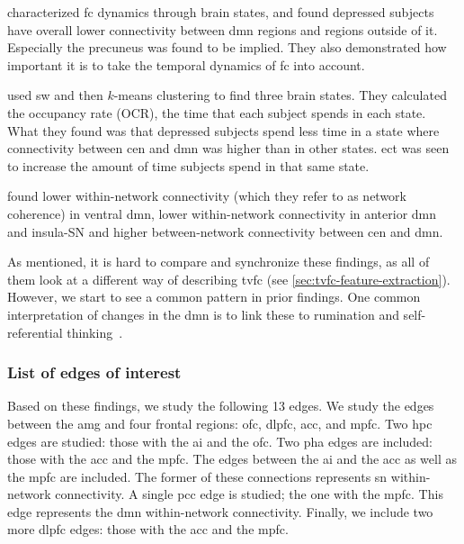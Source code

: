 \textcite{AlonsoMartinez2020} characterized \gls{fc} dynamics through brain states, and found depressed subjects have overall lower connectivity between \gls{dmn} regions and regions outside of it.
Especially the precuneus was found to be implied.
They also demonstrated how important it is to take the temporal dynamics of \gls{fc} into account.

\textcite{Dini2021} used \gls{sw} and then $k$-means clustering to find three brain states.
They calculated the occupancy rate (OCR), the time that each subject spends in each state.
What they found was that depressed subjects spend less time in a state where connectivity between \gls{cen} and \gls{dmn} was higher than in other states.
\Gls{ect} was seen to increase the amount of time subjects spend in that same state.

\textcite{Ho2021} found lower within-network connectivity (which they refer to as network coherence) in ventral \gls{dmn}, lower within-network connectivity in anterior \gls{dmn} and insula-SN and higher between-network connectivity between \gls{cen} and \gls{dmn}.

As mentioned, it is hard to compare and synchronize these findings, as all of them look at a different way of describing \gls{tvfc} (see \cref{sec:tvfc-feature-extraction}).
However, we start to see a common pattern in prior findings.
One common interpretation of changes in the \gls{dmn} is to link these to rumination and self-referential thinking~\parencite{Zhou2020}.

\subsubsection{List of edges of interest}

Based on these findings, we study the following 13 edges.
We study the edges between the \gls{amg} and four frontal regions: \gls{ofc}, \gls{dlpfc}, \gls{acc}, and \gls{mpfc}.
Two \gls{hpc} edges are studied: those with the \gls{ai} and the \gls{ofc}.
Two \gls{pha} edges are included: those with the \gls{acc} and the \gls{mpfc}.
The edges between the \gls{ai} and the \gls{acc} as well as the \gls{mpfc} are included.  %
The former of these connections represents \gls{sn} within-network connectivity.
A single \gls{pcc} edge is studied; the one with the \gls{mpfc}.  %
This edge represents the \gls{dmn} within-network connectivity.
Finally, we include two more \gls{dlpfc} edges: those with the \gls{acc} and the \gls{mpfc}. %

